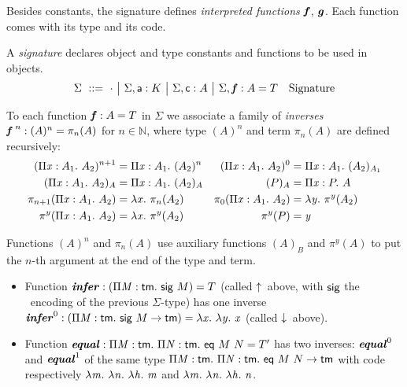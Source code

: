 \documentclass{llncs}
\begin{document}
Besides constants, the signature defines \emph{interpreted functions}
$\fct f$, $\fct g$. Each function comes with its type and its
code. 

\begin{definition}
  A \emph{signature} declares object and type constants and functions
  to be used in objects.
  \begin{align*}
    \Sigma &\gequal
    \gnil
    \gor
    \gcons \Sigma {\cst a : K}
    \gor
    \gcons \Sigma {\cst c : A}
    \gor
    \gcons \Sigma {\fct f : A = T}
    &\text{Signature}
  \end{align*}
\end{definition}

\begin{definition}
  To each function $\fct f : A = T$ in $\Sigma$ we associate a family
  of \emph{inverses} $\fcti f {\;n} : (A)^n = \pi_n(A)$ for $n\in\mathbb
  N$, where type $(A)^n$ and term $\pi_n(A)$ are defined recursively:
  \begin{align*}
    (\prd x {A_1} {A_2})^{n+1} &= \prd x {A_1} (A_2)^n &
    (\prd x {A_1} {A_2})^0 &= \prd x {A_1} (A_2)_{A_1} \\
    (\prd x {A_1} {A_2})_A &= \prd x {A_1} (A_2)_A &
    (P)_A &= \prd x P A \\
    \pi_{n+1}(\prd x {A_1}{A_2}) &= \lam x \pi_n(A_2) &
    \pi_0(\prd x {A_1} {A_2}) &= \lam {y} \pi^y(A_2) \\
    \pi^y(\prd x {A_1}{A_2}) &= \lam x \pi^y (A_2) &
    \pi^y(P) &= \var y
  \end{align*}
\end{definition}
Functions $(A)^n$ and $\pi_n(A)$ use auxiliary functions $(A)_B$ and
$\pi^y(A)$ to put the $n$-th argument at the end of the type and term.

\begin{example}
  \begin{itemize}
  \item
    Function $\fct{infer} : (\prd M {\cst{tm}} \app{\cst{sig}} M)
    = T$ (called $\finfer{}$ above, with $\cst{sig}$ the \LF\ encoding
    of the previous $\Sigma$-type) has one inverse $\fcti{infer}{0} :
    (\prd M {\cst{tm}} {\app{\cst{sig}} M} \to \cst{tm}) = \lam x \lam
    y \var x$ (called $\fget{}$ above).
  \item
    Function $\fct{equal} : \prd M {\cst{tm}} \prd N {\cst{tm}}
    \app{\cst{eq}}\app M N = T'$ has two inverses: $\fcti{equal}{0}$
    and $\fcti{equal}{1}$ of the same type $\prd M {\cst{tm}} \prd N
    {\cst{tm}} \app{\cst{eq}}\app M N \to \cst{tm}$ with code
    respectively $\lam m \lam n \lam h \var m$ and $\lam m \lam n \lam
    h \var n$.
  \end{itemize}
\end{example}
\end{document}

